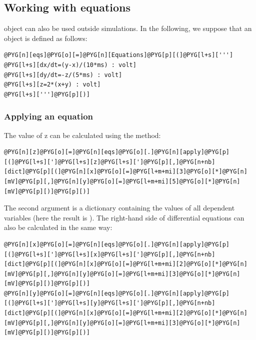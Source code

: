 \documentclass[letterpaper,10pt,english]{manual}
\begin{document}
\subsection{Working with equations}

\hyperlink{brian.Equations}{} object can also be used outside simulations.
In the following, we suppose that an \hyperlink{brian.Equations}{} object is defined as follows:

\begin{Verbatim}[commandchars=@\[\]]
@PYG[n][eqs]@PYG[o][=]@PYG[n][Equations]@PYG[p][(]@PYG[l+s][''']
@PYG[l+s][dx/dt=(y-x)/(10*ms) : volt]
@PYG[l+s][dy/dt=-z/(5*ms) : volt]
@PYG[l+s][z=2*(x+y) : volt]
@PYG[l+s][''']@PYG[p][)]
\end{Verbatim}

\hypertarget{index-17}{}\subsubsection{Applying an equation}

The value of z can be calculated using the  method:

\begin{Verbatim}[commandchars=@\[\]]
@PYG[n][z]@PYG[o][=]@PYG[n][eqs]@PYG[o][.]@PYG[n][apply]@PYG[p][(]@PYG[l+s][']@PYG[l+s][z]@PYG[l+s][']@PYG[p][,]@PYG[n+nb][dict]@PYG[p][(]@PYG[n][x]@PYG[o][=]@PYG[l+m+mi][3]@PYG[o][*]@PYG[n][mV]@PYG[p][,]@PYG[n][y]@PYG[o][=]@PYG[l+m+mi][5]@PYG[o][*]@PYG[n][mV]@PYG[p][)]@PYG[p][)]
\end{Verbatim}

The second argument is a dictionary containing the values of all dependent variables
(here the result is ).
The right-hand side of differential equations can also be calculated in the same way:

\begin{Verbatim}[commandchars=@\[\]]
@PYG[n][x]@PYG[o][=]@PYG[n][eqs]@PYG[o][.]@PYG[n][apply]@PYG[p][(]@PYG[l+s][']@PYG[l+s][x]@PYG[l+s][']@PYG[p][,]@PYG[n+nb][dict]@PYG[p][(]@PYG[n][x]@PYG[o][=]@PYG[l+m+mi][2]@PYG[o][*]@PYG[n][mV]@PYG[p][,]@PYG[n][y]@PYG[o][=]@PYG[l+m+mi][3]@PYG[o][*]@PYG[n][mV]@PYG[p][)]@PYG[p][)]
@PYG[n][y]@PYG[o][=]@PYG[n][eqs]@PYG[o][.]@PYG[n][apply]@PYG[p][(]@PYG[l+s][']@PYG[l+s][y]@PYG[l+s][']@PYG[p][,]@PYG[n+nb][dict]@PYG[p][(]@PYG[n][x]@PYG[o][=]@PYG[l+m+mi][2]@PYG[o][*]@PYG[n][mV]@PYG[p][,]@PYG[n][y]@PYG[o][=]@PYG[l+m+mi][3]@PYG[o][*]@PYG[n][mV]@PYG[p][)]@PYG[p][)]
\end{Verbatim}
\end{document}
